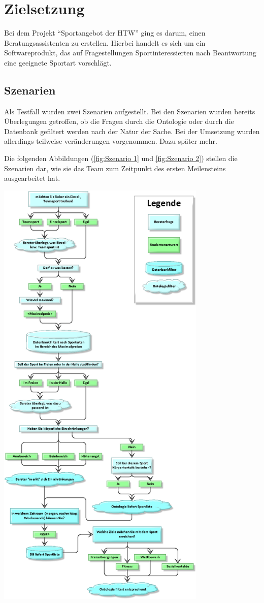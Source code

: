 \chapter{Zielsetzung}

Bei dem Projekt "`Sportangebot der HTW"' ging es darum, einen Beratungsassistenten zu erstellen. Hierbei handelt es sich um ein Softwareprodukt, das auf Fragestellungen Sportinteressierten nach Beantwortung eine geeignete Sportart vorschlägt.

\section{Szenarien}

Als Testfall wurden zwei Szenarien aufgestellt. Bei den Szenarien wurden bereits Überlegungen getroffen, ob die Fragen durch die Ontologie oder durch die Datenbank gefiltert werden nach der Natur der Sache. Bei der Umsetzung wurden allerdings teilweise veränderungen vorgenommen. Dazu später mehr.

Die folgenden Abbildungen (\ref{fig:Szenario 1} und \ref{fig:Szenario 2}) stellen die Szenarien dar, wie sie das Team zum Zeitpunkt des ersten Meilensteins ausgearbeitet hat.

\begin{capfigure}[Szenario 1]
	\includegraphics[width=100mm]{images/szenario1.png}
\end{capfigure}

